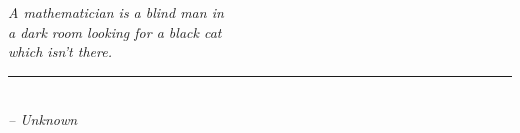 \providecommand{\bo}{\Sigma}
\providecommand{\co}{B}

\begin{flushleft}
	\textsl{A mathematician is a blind man in }\\
	\textsl{a dark room looking for a black cat}\\
	\textsl{which isn’t there.}\\
	\rule[0pt]{15em}{0.5pt}\\
	\textsl{-- Unknown}
	\vspace{2em}
\end{flushleft}
